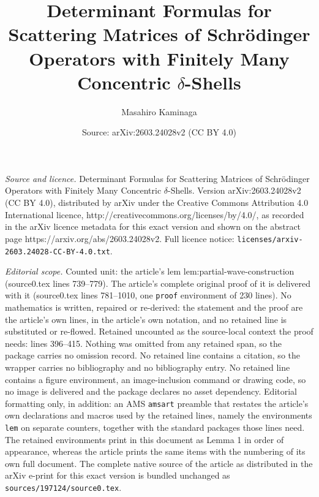 \documentclass[10pt,a4paper]{amsart}
\title{Determinant Formulas for Scattering Matrices of Schr\"odinger Operators with Finitely Many Concentric $\delta$-Shells}
\author{Masahiro Kaminaga}
\date{Source: arXiv:2603.24028v2 (CC BY 4.0)}
\begin{document}
\maketitle

\noindent\emph{Source and licence.} Determinant Formulas for Scattering Matrices of Schr\"odinger Operators with Finitely Many Concentric $\delta$-Shells. Version arXiv:2603.24028v2 (CC BY 4.0), distributed by arXiv under the Creative Commons Attribution 4.0 International licence, http://creativecommons.org/licenses/by/4.0/, as recorded in the arXiv licence metadata for this exact version and shown on the abstract page https://arxiv.org/abs/2603.24028v2. Full licence notice: \texttt{licenses/arxiv-2603.24028-CC-BY-4.0.txt}.\par\smallskip

\noindent\textit{Editorial scope.} Counted unit: the article's lem lem:partial-wave-construction (source0.tex lines 739--779). The article's complete original proof of it is delivered with it (source0.tex lines 781--1010, one \texttt{proof} environment of 230 lines). No mathematics is written, repaired or re-derived: the statement and the proof are the article's own lines, in the article's own notation, and no retained line is substituted or re-flowed.  Retained uncounted as the source-local context the proof needs: lines 396--415.  Nothing was omitted from any retained span, so the package carries no omission record.  No retained line contains a citation, so the wrapper carries no bibliography and no bibliography entry.  No retained line contains a figure environment, an image-inclusion command or drawing code, so no image is delivered and the package declares no asset dependency.  Editorial formatting only, in addition: an AMS \texttt{amsart} preamble that restates the article's own declarations and macros used by the retained lines, namely the environments \texttt{lem} on separate counters, together with the standard packages those lines need.  The retained environments print in this document as Lemma 1 in order of appearance, whereas the article prints the same items with the numbering of its own full document.  The complete native source of the article as distributed in the arXiv e-print for this exact version is bundled unchanged as \texttt{sources/197124/source0.tex}.
\end{document}

